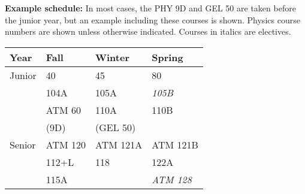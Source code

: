 \documentclass[12pt]{article}
\begin{document}
\noindent
{\bf Example schedule:} In most cases, the PHY 9D and GEL 50 are taken
before the junior year, but an example including these courses is
shown.  Physics course numbers are shown unless otherwise indicated.
Courses in italics are electives.
\begin{center}
\begin{tabular}{|l|l|l|l|}
\hline
Year      & Fall    & Winter & Spring \\
\hline
Junior    & 40         & 45           & 80 \\
          & 104A       & 105A         & {\it 105B} \\
          & ATM 60     & 110A         & 110B \\
          & (9D)       & (GEL 50)     & \\
\hline
Senior   & ATM 120       & ATM 121A     & ATM 121B \\
         & 112+L         & 118          & 122A \\
         & 115A          &              & {\it ATM 128}\\
\hline
\end{tabular}
\end{center}
\end{document}
